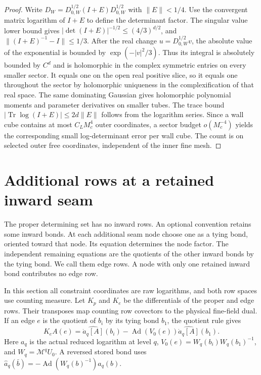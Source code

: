 \documentclass[11pt,letterpaper,reqno]{amsart}
\numberwithin{equation}{section}
\theoremstyle{definition}
\theoremstyle{remark}
\begin{document}
\begin{proof}
Write \(D_W=D_{0,W}^{1/2}(I+E)D_{0,W}^{1/2}\) with \(\|E\|<1/4\). Use the convergent matrix logarithm of \(I+E\) to define the determinant factor. The singular value lower bound gives \(|\det(I+E)|^{-1/2}\le(4/3)^{d/2}\), and \(\|(I+E)^{-1}-I\|\le1/3\). After the real change \(u=D_{0,W}^{1/2}v\), the absolute value of the exponential is bounded by \(\exp(-|v|^2/3)\). Thus its integral is absolutely bounded by \(C^d\) and is holomorphic in the complex symmetric entries on every smaller sector. It equals one on the open real positive slice, so it equals one throughout the sector by holomorphic uniqueness in the complexification of that real space. The same dominating Gaussian gives holomorphic polynomial moments and parameter derivatives on smaller tubes. The trace bound \(|\operatorname{Tr}\log(I+E)|\le 2d\|E\|\) follows from the logarithm series. Since a wall cube contains at most \(C_L M_c^4\) outer coordinates, a sector budget \(o(M_c^{-4})\) yields the corresponding small log-determinant error per wall cube. The count is on selected outer free coordinates, independent of the inner fine mesh.
\end{proof}


\section{Additional rows at a retained inward seam}\label{mb:retained-seam}

The proper determining set has no inward rows. An optional
convention retains some inward bonds. At each additional seam
node choose one as a tying bond, oriented toward that node.
Its equation determines the node factor. The independent remaining
equations are the quotients of the other inward bonds by the
tying bond. We call them edge rows. A node with only one retained
inward bond contributes no edge row.

In this section all constraint coordinates are raw logarithms,
and both row spaces use counting measure. Let $K_p$ and $K_e$
be the differentials of the proper and edge rows. Their
transposes map counting row covectors to the physical fine-field
dual. If an edge $e$ is the quotient of $b_i$ by its tying bond
$b_1$, the quotient rule gives
\begin{equation}\label{mb:seam-differential}
 K_eA(e)=\widehat{\dot a_q[A]}(b_i)
       -\operatorname{Ad}(V_0(e))\widehat{\dot a_q[A]}(b_1).
\end{equation}
Here $a_q$ is the actual reduced logarithm at level $q$,
$V_0(e)=W_q(b_i)W_q(b_1)^{-1}$, and $W_q=\mathcal M^qU_0$.
A reversed stored bond uses
$\widehat a_q(\bar b)=-\operatorname{Ad}(W_q(b)^{-1})a_q(b)$.
\end{document}
